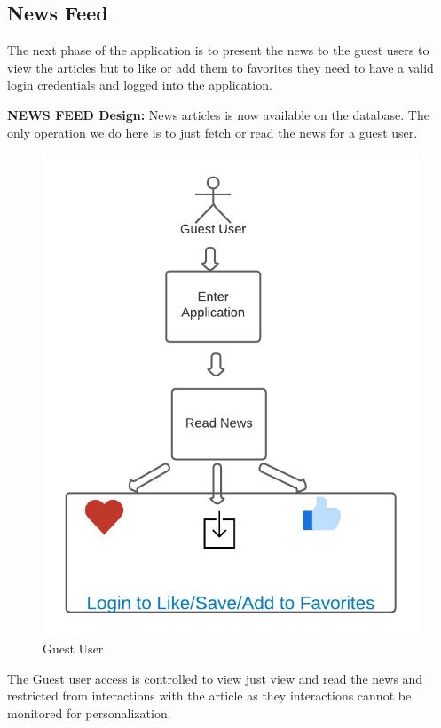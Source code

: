 \subsection{News Feed}
 The next phase of the application is to present the news to the guest users to view the articles but to like or add them to favorites they need to have a valid login credentials and logged into the application.
 
 \textbf{NEWS FEED Design:}
    News articles is now available on the database. The only operation we do here is to just fetch or read the news for a guest user.  
    \begin{figure}[h!] 
  \begin{center}
          \includegraphics[scale=1]{images/GuestUser.png}
        \centering \caption{Guest User}
    \end{center}
    \end{figure}
The Guest user access is controlled to view just view and read the news and restricted from interactions with the article as they interactions cannot be monitored for personalization. \newline

